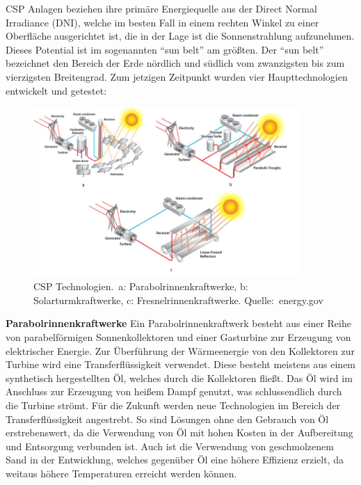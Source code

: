 ﻿CSP Anlagen beziehen ihre primäre Energiequelle aus der Direct Normal Irradiance (DNI), welche im besten Fall in einem rechten Winkel zu einer Oberfläche ausgerichtet ist, die in der Lage ist die Sonnenstrahlung aufzunehmen. Dieses Potential ist im sogenannten "`sun belt"' am größten. Der "`sun belt"' bezeichnet den Bereich der Erde nördlich und südlich vom zwanzigsten bis zum vierzigsten Breitengrad. Zum jetzigen Zeitpunkt wurden vier Haupttechnologien entwickelt und getestet\cite{viebahn2011}:

\begin{figure}[H]
	\centering
	\includegraphics[width=0.9\textwidth,trim=1 1 1 1,clip]{technik.png}
	\caption{CSP Technologien.\ a: Parabolrinnenkraftwerke, b: Solarturmkraftwerke, c: Fresnelrinnenkraftwerke. Quelle:~energy.gov}
	\label{fig:technik}
\end{figure}

\textbf{Parabolrinnenkraftwerke}
\newline
Ein Parabolrinnenkraftwerk besteht aus einer Reihe von parabelförmigen Sonnenkollektoren und einer Gasturbine zur Erzeugung von elektrischer Energie. Zur Überführung der Wärmeenergie von den Kollektoren zur Turbine wird eine Transferflüssigkeit verwendet. Diese besteht meistens aus einem synthetisch hergestellten Öl, welches durch die Kollektoren fließt. Das Öl wird im Anschluss zur Erzeugung von heißem Dampf genutzt, was schlussendlich durch die Turbine strömt. Für die Zukunft werden neue Technologien im Bereich der Transferflüssigkeit angestrebt. So sind Lösungen ohne den Gebrauch von Öl erstrebenswert, da die Verwendung von Öl mit hohen Kosten in der Aufbereitung und Entsorgung verbunden ist. Auch ist die Verwendung von geschmolzenem Sand in der Entwicklung, welches gegenüber Öl eine höhere Effizienz erzielt, da weitaus höhere Temperaturen erreicht werden können.
\cite{viebahn2008}

